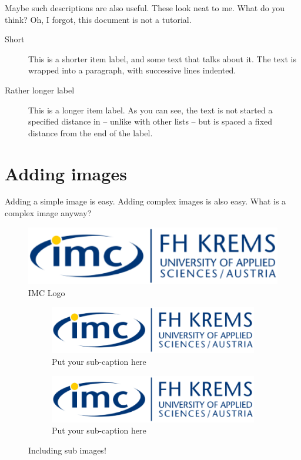 \documentclass{imc-inf}
\begin{document}
Maybe such descriptions are also useful. These look neat to me. What do you think? Oh, I forgot, this document is not a tutorial. 
\begin{description}
	\item[Short] This is a shorter item label, and some text that talks
	about it. The text is wrapped into a paragraph, with successive
	lines indented.
	\item[Rather longer label] This is a longer item label.  As you can
	see, the text is not started a specified distance in -- unlike
	with other lists -- but is spaced a fixed distance from the end
	of the label.
\end{description}



\section{Adding images}
Adding a simple image is easy. Adding complex images is also easy. What is a complex image anyway? 
\begin{figure}[h]
	\centering
	\includegraphics[width=1.0\textwidth]{imclogo.png}
	\caption{IMC Logo}
	\label{fig:logo}
\end{figure}





\begin{figure}[ht]
	\begin{subfigure}{.5\textwidth}
		\centering
		\includegraphics[width=.8\linewidth]{imclogo.png}  
		\caption{Put your sub-caption here}
		\label{fig:sub-first}
	\end{subfigure}
	\begin{subfigure}{.5\textwidth}
		\centering
		\includegraphics[width=.8\linewidth]{imclogo.png}  
		\caption{Put your sub-caption here}
		\label{fig:sub-second}
	\end{subfigure}
	\caption{Including sub images! }
	\label{fig:fig}
\end{figure}
\end{document}
